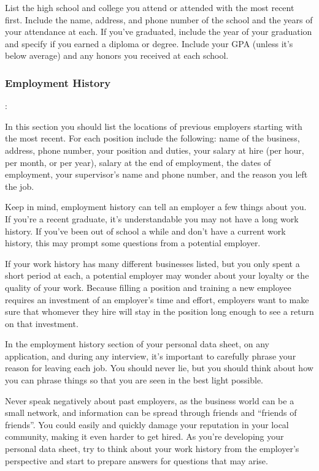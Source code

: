 List the high school and college you attend or attended with the most recent first. Include the name, address, and phone number of the school and the years of your attendance at each. If you've graduated, include the year of your graduation and specify if you earned a diploma or degree. Include your GPA (unless it’s below average) and any honors you received at each school.

\subsubsection*{Employment History}:

In this section you should list the locations of previous employers starting with the most recent. For each position include the following: name of the business, address, phone number, your position and duties, your salary at hire (per hour, per month, or per year), salary at the end of employment, the dates of employment, your supervisor's name and phone number, and the reason you left the job.

Keep in mind, employment history can tell an employer a few things about you. If you're a recent graduate, it's understandable you may not have a long work history. If you've been out of school a while and don't have a current work history, this may prompt some questions from a potential employer.

If your work history has many different businesses listed, but you only spent a short period at each, a potential employer may wonder about your loyalty or the quality of your work. Because filling a position and training a new employee requires an investment of an employer's time and effort, employers want to make sure that whomever they hire will stay in the position long enough to see a return on that investment.

In the employment history section of your personal data sheet, on any application, and during any interview, it's important to carefully phrase your reason for leaving each job. You should never lie, but you should think about how you can phrase things so that you are seen in the best light possible.

Never speak negatively about past employers, as the business world can be a small network, and information can be spread through friends and ``friends of friends''. You could easily and quickly damage your reputation in your local community, making it even harder to get hired. As you're developing your personal data sheet, try to think about your work history from the employer's perspective and start to prepare answers for questions that may arise.

